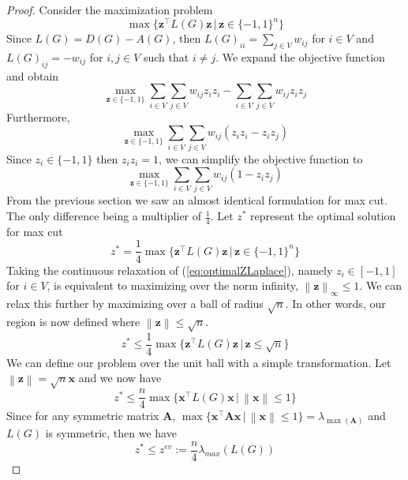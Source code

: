 \documentclass[12pt]{article}
\theoremstyle{plain}
\theoremstyle{definition}
\newcommand{\norm}[1]{\left\lVert#1\right\rVert}
\begin{document}
\begin{proof}
    Consider the maximization problem 
    \[
    \max\lbrace \mathbf{z}^\top L(G) \mathbf{z}\,|\,\mathbf{z} \in \lbrace -1,1 \rbrace^n  \rbrace
    \]
    Since $L(G) = D(G) - A(G)$, then $L(G)_{ii} = \sum_{j\in V} w_{ij}$ for $i \in V$ and $L(G)_{ij} = -w_{ij}$ for $i,j \in V$ such that $i \neq j$. We expand the objective function and obtain
    \[
        \max_{\mathbf{z} \in \lbrace -1,1 \rbrace} \sum_{i \in V}\sum_{j \in V} w_{ij} z_i z_i - \sum_{i \in V}\sum_{j \in V} w_{ij}z_i z_j
    \]
    Furthermore,
    \[
        \max_{\mathbf{z} \in \lbrace -1,1 \rbrace} \sum_{i \in V} \sum_{j \in V} w_{ij} (z_i z_i - z_i z_j) 
    \]
    Since $z_i \in \lbrace -1, 1 \rbrace$ then $z_i z_i=1$, we can simplify the objective function to
    \[
        \max_{\mathbf{z} \in \lbrace -1,1 \rbrace} \sum_{i \in V} \sum_{j \in V} w_{ij} (1- z_i z_j)
    \]
    From the previous section we saw an almost identical formulation for max cut. The only difference being a multiplier of $\frac{1}{4}$. Let $z^*$ represent the optimal solution for max cut
    \begin{equation}\label{eq:optimalZLaplace}
        z^* = \frac{1}{4} \max \lbrace \mathbf{z}^\top L(G) \mathbf{z} \,|\, \mathbf{z} \in \lbrace -1,1 \rbrace^n \rbrace
    \end{equation}
    Taking the continuous relaxation of (\ref{eq:optimalZLaplace}), namely $z_i \in \left[-1,1 \right]$ for $i \in V$, is equivalent to maximizing
    over the norm infinity, $\norm{\mathbf{z}}_\infty \leq 1$. We can relax this further by maximizing over a ball of radius $\sqrt{n}$. In other words,
    our region is now defined where $\norm{\mathbf{z}} \leq \sqrt{n}$. 
    \begin{equation}
    z^* \leq \frac{1}{4} \max \lbrace \mathbf{z}^\top L(G) \mathbf{z} \,|\, \mathbf{z} \leq \sqrt{n} \rbrace
    \end{equation}    
    We can define our problem over the unit ball with a simple transformation. Let $\norm{\mathbf{z}} = \sqrt{n} \mathbf{x}$ and
    we now have
    \begin{equation}
        z^* \leq \frac{n}{4} \max \lbrace \mathbf{x}^\top L(G) \mathbf{x} \,|\, \norm{\mathbf{x}} \leq 1 \rbrace
    \end{equation}  
    Since for any symmetric matrix $\mathbf{A}$, $\max\lbrace \mathbf{x}^\top \mathbf{A} \mathbf{x}\,|\, \norm{\mathbf{x}} \leq 1 \rbrace = \lambda_{\max(\mathbf{A})}$ 
    and $L(G)$ is symmetric, then we have 
    \begin{equation}
    z^* \leq z^{ev} := \dfrac{n}{4} \lambda_{max}(L(G))
    \end{equation}
\end{proof}
\end{document}
